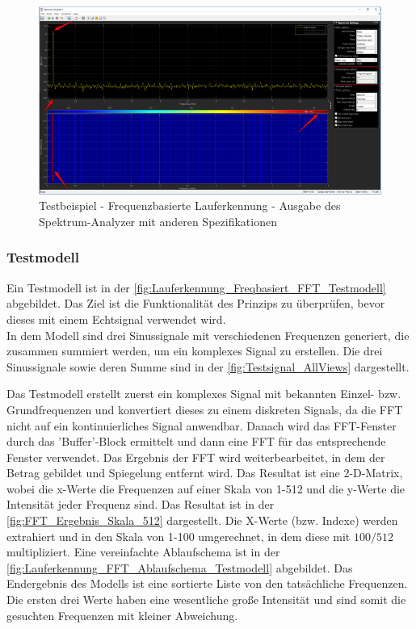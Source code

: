 \begin{figure}[H]
	\centering
	\includegraphics[width=\linewidth]{Bilder/Lauferkennung_Freqbasiert_SpektrumAnalyzerAusgabe_2Einstellungen.png}
	\caption{Testbeispiel - Frequenzbasierte Lauferkennung - Ausgabe des Spektrum-Analyzer mit anderen Spezifikationen}
	\label{fig:Lauferkennung_Freqbasiert_SpektrumAnalyzerAusgabe_2Einstellungen}
\end{figure}

\subsubsection{Testmodell}
Ein Testmodell ist in der \autoref{fig:Lauferkennung_Freqbasiert_FFT_Testmodell} abgebildet. Das Ziel ist die Funktionalität des Prinzips zu überprüfen, bevor dieses mit einem Echtsignal verwendet wird.\\
In dem Modell sind drei Sinussignale mit verschiedenen Frequenzen generiert, die zusammen summiert werden, um ein komplexes Signal zu erstellen.
Die drei Sinussignale sowie deren Summe sind in der \autoref{fig:Testsignal_AllViews} dargestellt.

Das Testmodell erstellt zuerst ein komplexes Signal mit bekannten Einzel- bzw. Grundfrequenzen und konvertiert dieses zu einem diskreten Signals, da die FFT nicht auf ein kontinuierliches Signal anwendbar. Danach wird das FFT-Fenster durch das 'Buffer'-Block ermittelt und dann eine FFT für das entsprechende Fenster verwendet. Das Ergebnis der FFT wird weiterbearbeitet, in dem der Betrag gebildet und Spiegelung entfernt wird. Das Resultat ist eine 2-D-Matrix, wobei die x-Werte die Frequenzen auf einer Skala von 1-512 und die y-Werte die Intensität jeder Frequenz sind. Das Resultat ist in der \autoref{fig:FFT_Ergebnis_Skala_512} dargestellt. Die X-Werte (bzw. Indexe) werden extrahiert und in den Skala von 1-100 umgerechnet, in dem diese mit $100/512$ multipliziert. Eine vereinfachte Ablaufschema ist in der \autoref{fig:Lauferkennung_FFT_Ablaufschema_Testmodell} abgebildet.
Das Endergebnis des Modells ist eine sortierte Liste von den tatsächliche Frequenzen. Die ersten drei Werte haben eine wesentliche große Intensität und sind somit die gesuchten Frequenzen mit kleiner Abweichung.


